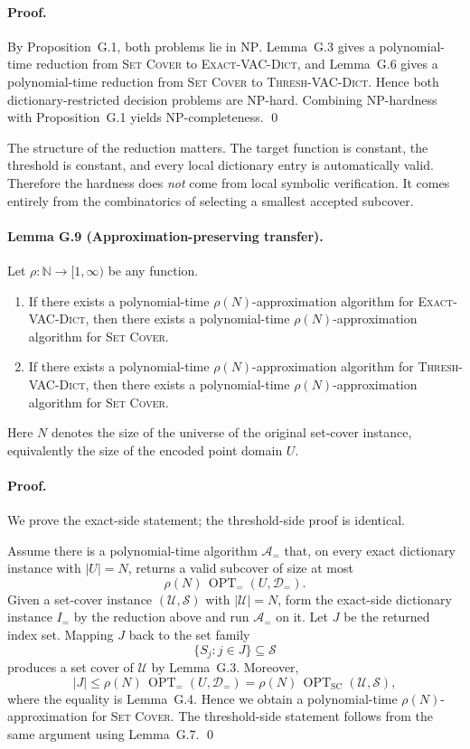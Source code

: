 \paragraph{Proof.}
By Proposition~G.1, both problems lie in $\mathrm{NP}$. Lemma~G.3 gives a polynomial-time reduction from \textsc{Set Cover} to \textsc{Exact-VAC-Dict}, and Lemma~G.6 gives a polynomial-time reduction from \textsc{Set Cover} to \textsc{Thresh-VAC-Dict}. Hence both dictionary-restricted decision problems are NP-hard. Combining NP-hardness with Proposition~G.1 yields NP-completeness. \qed

The structure of the reduction matters. The target function is constant, the threshold is constant, and every local dictionary entry is automatically valid. Therefore the hardness does \emph{not} come from local symbolic verification. It comes entirely from the combinatorics of selecting a smallest accepted subcover.

\paragraph{Lemma G.9 (Approximation-preserving transfer).}
Let $\rho:\mathbb N\to[1,\infty)$ be any function.
\begin{enumerate}
    \item If there exists a polynomial-time $\rho(N)$-approximation algorithm for \textsc{Exact-VAC-Dict}, then there exists a polynomial-time $\rho(N)$-approximation algorithm for \textsc{Set Cover}.
    \item If there exists a polynomial-time $\rho(N)$-approximation algorithm for \textsc{Thresh-VAC-Dict}, then there exists a polynomial-time $\rho(N)$-approximation algorithm for \textsc{Set Cover}.
\end{enumerate}
Here $N$ denotes the size of the universe of the original set-cover instance, equivalently the size of the encoded point domain $U$.

\paragraph{Proof.}
We prove the exact-side statement; the threshold-side proof is identical.

Assume there is a polynomial-time algorithm $\mathcal A_{=}$ that, on every exact dictionary instance with $|U|=N$, returns a valid subcover of size at most
\[
\rho(N)\,\operatorname{OPT}_{=}(U,\mathcal D_{=}).
\]
Given a set-cover instance $(\mathcal U,\mathcal S)$ with $|\mathcal U|=N$, form the exact-side dictionary instance $I_{=}$ by the reduction above and run $\mathcal A_{=}$ on it. Let $J$ be the returned index set. Mapping $J$ back to the set family
\[
\{S_j:j\in J\}\subseteq\mathcal S
\]
produces a set cover of $\mathcal U$ by Lemma~G.3. Moreover,
\[
|J|
\le
\rho(N)\,\operatorname{OPT}_{=}(U,\mathcal D_{=})
=
\rho(N)\,\operatorname{OPT}_{\mathrm{SC}}(\mathcal U,\mathcal S),
\]
where the equality is Lemma~G.4. Hence we obtain a polynomial-time $\rho(N)$-approximation for \textsc{Set Cover}. The threshold-side statement follows from the same argument using Lemma~G.7. \qed

